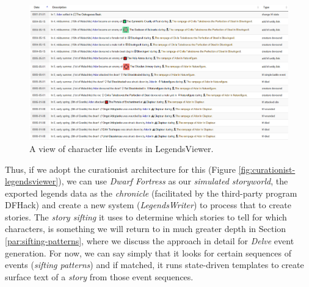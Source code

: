 
\begin{figure}
    \centering
    \includegraphics[width=\textwidth]{figures/4-Delve/legendsviewer.png}
    \caption{A view of character life events in LegendsViewer.}
    \label{fig:legendsviewer}
\end{figure}


Thus, if we adopt the curationist architecture for this (Figure \ref{fig:curationist-legendsviewer}), we can use \textit{Dwarf Fortress} as our \textit{simulated storyworld}, the exported legends data as the \textit{chronicle} (facilitated by the third-party program DFHack) and create a new system (\textit{LegendsWriter}) to process that to create stories. The \textit{story sifting} it uses to determine which stories to tell for which characters, is something we will return to in much greater depth in Section \ref{par:sifting-patterns}, where we discuss the approach in detail for \textit{Delve} event generation. For now, we can say simply that it looks for certain sequences of events (\textit{sifting patterns}) and if matched, it runs state-driven templates to create surface text of a \textit{story} from those event sequences.


